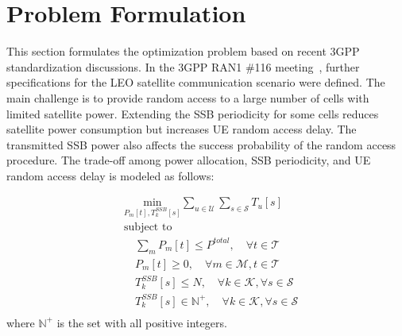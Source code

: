 
\section{Problem Formulation}
This section formulates the optimization problem based on recent 3GPP standardization discussions. In the 3GPP RAN1 \#116 meeting~\cite{ran1-116}, further specifications for the LEO satellite communication scenario were defined. The main challenge is to provide random access to a large number of cells with limited satellite power. Extending the SSB periodicity for some cells reduces satellite power consumption but increases UE random access delay. The transmitted SSB power also affects the success probability of the random access procedure. The trade-off among power allocation, SSB periodicity, and UE random access delay is modeled as follows:

\begin{equation}
\begin{aligned}
    & \underset{P_m[t], T_k^{SSB}[s]}{\text{min}} \sum_{u \in \mathcal{U}} \sum_{s \in \mathcal{S}} T_u[s] \\
    & \text{subject to} \\
    & \quad \sum_{m} P_{m}[t] \leq P^{total}, \quad \forall t \in \mathcal{T} \\
    & \quad P_{m}[t] \geq 0, \quad \forall m \in \mathcal{M}, t \in \mathcal{T} \\
    & \quad T_k^{SSB}[s] \leq N, \quad \forall k \in \mathcal{K}, \forall s \in \mathcal{S} \\
    & \quad T_k^{SSB}[s] \in \mathbb{N}^+, \quad \forall k \in \mathcal{K}, \forall s \in \mathcal{S} \\
\end{aligned}
\end{equation}
where $\mathbb{N}^+$ is the set with all positive integers. 

